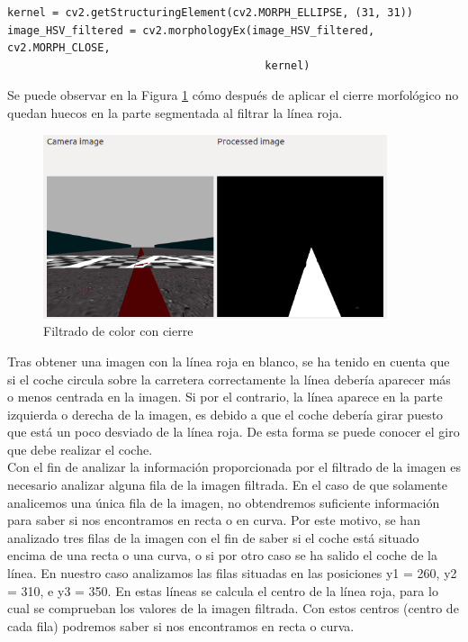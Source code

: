 \vspace{10pt}
\begin{lstlisting}
kernel = cv2.getStructuringElement(cv2.MORPH_ELLIPSE, (31, 31))
image_HSV_filtered = cv2.morphologyEx(image_HSV_filtered, cv2.MORPH_CLOSE,
                                        kernel)
\end{lstlisting}
\vspace{20pt}

Se puede observar en la Figura \ref{fig.cierre} cómo después de aplicar el cierre morfológico no quedan huecos en la parte segmentada al filtrar la línea roja. \\

\begin{figure}[H]
  \begin{center}
    \includegraphics[width=0.9\textwidth]{figures/Infraestructura/filtro_cierre.png}
		\caption{Filtrado de color con cierre}
		\label{fig.cierre}
		\end{center}
\end{figure}

Tras obtener una imagen con la línea roja en blanco, se ha tenido en cuenta que si el coche circula sobre la carretera correctamente la línea debería aparecer más o menos centrada en la imagen. Si por el contrario, la línea aparece en la parte izquierda o derecha de la imagen, es debido a que el coche debería girar puesto que está un poco desviado de la línea roja. De esta forma se puede conocer el giro que debe realizar el coche.\\

Con el fin de analizar la información proporcionada por el filtrado de la imagen es necesario analizar alguna fila de la imagen filtrada. En el caso de que solamente analicemos una única fila de la imagen, no obtendremos suficiente información para saber si nos encontramos en recta o en curva. Por este motivo, se han analizado tres filas de la imagen con el fin de saber si el coche está situado encima de una recta o una curva, o si por otro caso se ha salido el coche de la línea. En nuestro caso analizamos las filas situadas en las posiciones y1 = 260, y2 = 310, e y3 = 350. En estas líneas se calcula el centro de la línea roja, para lo cual se comprueban los valores de la imagen filtrada. Con estos centros (centro de cada fila) podremos saber si nos encontramos en recta o curva.\\

